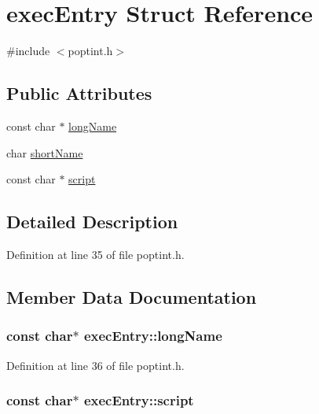 \hypertarget{structexec_entry}{}\section{exec\+Entry Struct Reference}
\label{structexec_entry}


{\ttfamily \#include $<$poptint.\+h$>$}

\subsection*{Public Attributes}
\begin{DoxyCompactItemize}
\item 
const char $\ast$ \hyperlink{structexec_entry_aea9107db2a7d7ce2e5de825f4e4237c9}{long\+Name}
\item 
char \hyperlink{structexec_entry_af6c333959b21ca21072a9d8fb8de251c}{short\+Name}
\item 
const char $\ast$ \hyperlink{structexec_entry_aad7a7fd50d3e97cdd9b27a122d0ec711}{script}
\end{DoxyCompactItemize}


\subsection{Detailed Description}


Definition at line 35 of file poptint.\+h.



\subsection{Member Data Documentation}
\hypertarget{structexec_entry_aea9107db2a7d7ce2e5de825f4e4237c9}{}
\subsubsection[{long\+Name}]{\setlength{\rightskip}{0pt plus 5cm}const char$\ast$ exec\+Entry\+::long\+Name}\label{structexec_entry_aea9107db2a7d7ce2e5de825f4e4237c9}


Definition at line 36 of file poptint.\+h.

\hypertarget{structexec_entry_aad7a7fd50d3e97cdd9b27a122d0ec711}{}
\subsubsection[{script}]{\setlength{\rightskip}{0pt plus 5cm}const char$\ast$ exec\+Entry\+::script}\label{structexec_entry_aad7a7fd50d3e97cdd9b27a122d0ec711}


